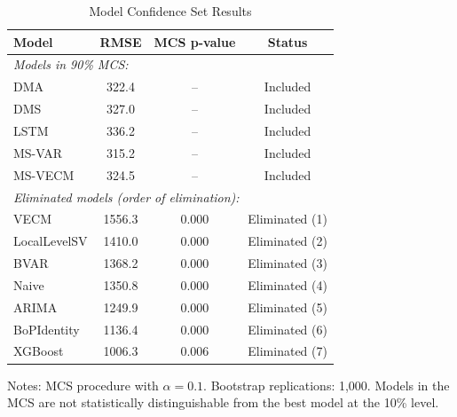 \begin{table}[htbp]
\centering
\small
\caption{Model Confidence Set Results}
\label{tab:mcs}
\begin{tabular}{lccc}
\toprule
Model & RMSE & MCS p-value & Status \\
\midrule
\multicolumn{4}{l}{\textit{Models in 90\% MCS:}} \\
DMA & 322.4 & -- & Included \\
DMS & 327.0 & -- & Included \\
LSTM & 336.2 & -- & Included \\
MS-VAR & 315.2 & -- & Included \\
MS-VECM & 324.5 & -- & Included \\
\midrule
\multicolumn{4}{l}{\textit{Eliminated models (order of elimination):}} \\
VECM & 1556.3 & 0.000 & Eliminated (1) \\
LocalLevelSV & 1410.0 & 0.000 & Eliminated (2) \\
BVAR & 1368.2 & 0.000 & Eliminated (3) \\
Naive & 1350.8 & 0.000 & Eliminated (4) \\
ARIMA & 1249.9 & 0.000 & Eliminated (5) \\
BoPIdentity & 1136.4 & 0.000 & Eliminated (6) \\
XGBoost & 1006.3 & 0.006 & Eliminated (7) \\
\bottomrule
\end{tabular}
\begin{tablenotes}
\small
\item Notes: MCS procedure with $\alpha = 0.1$. 
Bootstrap replications: 1,000. Models in the MCS are not statistically 
distinguishable from the best model at the 10\% level.
\end{tablenotes}
\end{table}